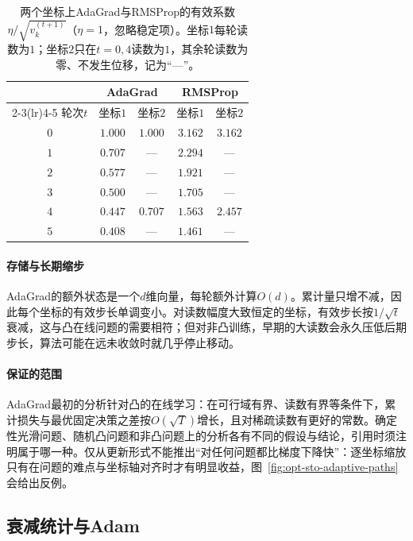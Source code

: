 \begin{table}[!htbp]
  \centering
  \small
  \caption{两个坐标上AdaGrad与RMSProp的有效系数$\eta/\sqrt{v_k^{(t+1)}}$（$\eta=1$，忽略稳定项）。坐标$1$每轮读数为$1$；坐标$2$只在$t=0,4$读数为$1$，其余轮读数为零、不发生位移，记为“—”。}
  \label{tab:opt-sto-adagrad-steps}
  \begin{tabular}{ccccc}
    \toprule
    & \multicolumn{2}{c}{AdaGrad} & \multicolumn{2}{c}{RMSProp}\\
    \cmidrule(lr){2-3}\cmidrule(lr){4-5}
    轮次$t$ & 坐标$1$ & 坐标$2$ & 坐标$1$ & 坐标$2$\\
    \midrule
    $0$ & $1.000$ & $1.000$ & $3.162$ & $3.162$\\
    $1$ & $0.707$ & — & $2.294$ & —\\
    $2$ & $0.577$ & — & $1.921$ & —\\
    $3$ & $0.500$ & — & $1.705$ & —\\
    $4$ & $0.447$ & $0.707$ & $1.563$ & $2.457$\\
    $5$ & $0.408$ & — & $1.461$ & —\\
    \bottomrule
  \end{tabular}
\end{table}

\paragraph{存储与长期缩步}
AdaGrad的额外状态是一个$d$维向量，每轮额外计算$O(d)$。累计量只增不减，因此每个坐标的有效步长单调变小。对读数幅度大致恒定的坐标，有效步长按$1/\sqrt t$衰减，这与凸在线问题的需要相符；但对非凸训练，早期的大读数会永久压低后期步长，算法可能在远未收敛时就几乎停止移动。

\paragraph{保证的范围}
AdaGrad最初的分析针对凸的在线学习：在可行域有界、读数有界等条件下，累计损失与最优固定决策之差按$O(\sqrt T)$增长，且对稀疏读数有更好的常数。确定性光滑问题、随机凸问题和非凸问题上的分析各有不同的假设与结论，引用时须注明属于哪一种。仅从更新形式不能推出“对任何问题都比梯度下降快”：逐坐标缩放只有在问题的难点与坐标轴对齐时才有明显收益，图~\ref{fig:opt-sto-adaptive-paths}会给出反例。

\subsection{衰减统计与Adam}
\label{sec:opt-sto-adam}

